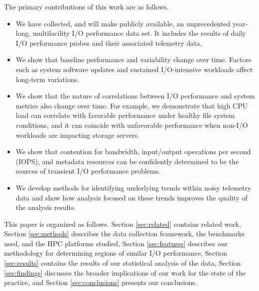 

The primary contributions of this work are as follows. 
\begin{itemize}[leftmargin=*]
\item We have collected, and will make publicly available, an unprecedented year-long, multifacility
I/O performance data set. It includes the results of daily I/O performance
probes and their associated telemetry data.
\item We show that baseline performance and variability change over time.
Factors such as system software updates and sustained I/O-intensive workloads affect long-term variations.
\item We show that the nature of correlations between I/O performance and system metrics also change over
time. For example, we demonstrate that high CPU load can correlate with favorable performance under healthy file system conditions, and it can coincide with unfavorable performance when non-I/O workloads are impacting storage servers.
\item We show that contention for bandwidth, input/output operations per second (IOPS), and metadata resources can be confidently determined to be the sources of transient I/O performance problems.
\item We develop methods for identifying
underlying trends within noisy telemetry data and show how analysis focused
on these trends improves the quality of the analysis results.
\end{itemize}


This paper is organized as follows. Section \ref{sec:related} contains related work, Section \ref{sec:methods} describes the data collection framework, the benchmarks used, and the HPC platforms studied, Section \ref{sec:features} describes our methodology for determining regions of similar I/O performance, Section \ref{sec:results} contains the results of our statistical analysis of the data, Section \ref{sec:findings}  discusses the broader implications of our work for the state of the practice, and Section \ref{sec:conclusions} presents our conclusions. 

